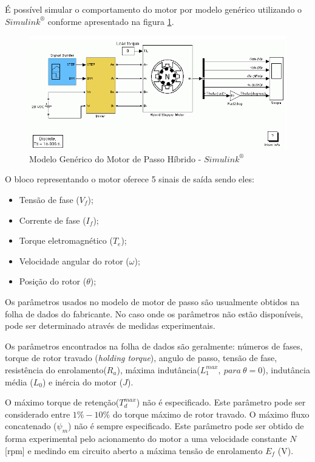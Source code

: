 É possível simular o comportamento do motor por modelo genérico utilizando o $Simulink^\circledR$ conforme apresentado na figura \ref{fig:fig2}.

\begin{figure}[H]
	\centering
	\includegraphics[scale=.42]{Images/modeloEE_HSM.PNG}
	\caption{ Modelo Genérico do Motor de Passo Híbrido - $Simulink^{\circledR}$ }
	\label{fig:fig2}
\end{figure}

O bloco representando o motor oferece 5 sinais de saída sendo eles:

\begin{itemize}
	\item Tensão de fase ($V_f$);
	\item Corrente de fase ($I_f$);
	\item Torque eletromagnético ($T_e$);
	\item Velocidade angular do rotor ($\omega$);
	\item Posição do rotor ($\theta$);
\end{itemize}

Os parâmetros usados no modelo de motor de passo são usualmente obtidos na folha de dados do fabricante. No caso onde os parâmetros não estão disponíveis, pode ser determinado através de medidas experimentais.

Os parâmetros encontrados na folha de dados são geralmente: números de fases, torque de rotor travado (\textit{holding torque}), angulo de passo, tensão de fase, resistência do enrolamento($R_a$), máxima indutância($L_1^{max},\ para\ \theta=0$), indutância média ($L_0$) e inércia do motor ($J$).

O máximo torque de retenção($T_d^{max}$) não é especificado. Este parâmetro pode  ser considerado entre $1\%-10\%$ do torque máximo de rotor travado. O máximo fluxo concatenado ($\psi_m$) não é sempre especificado. Este parâmetro pode ser obtido de forma experimental pelo acionamento do motor a uma velocidade constante $N$ [rpm] e medindo em circuito aberto a máxima tensão de enrolamento $E_f$ (V).

